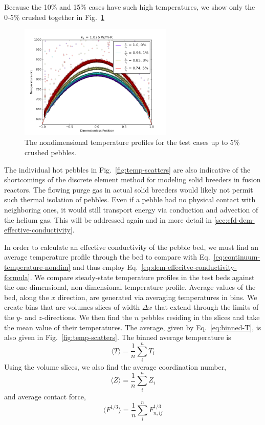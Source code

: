 Because the 10\% and 15\% cases have such high temperatures, we show only the 0-5\% crushed together in Fig.~\ref{fig:temp-scatters-zoomed}

\begin{figure}[htbp]
	\centering
	\includegraphics[width=0.65\textwidth]{chapters/figures/dem-evap-0-5-scatter-keff.png}
	\caption{The nondimensional temperature profiles for the test cases up to 5\% crushed pebbles.}
\label{fig:temp-scatters-zoomed}
\end{figure}

The individual hot pebbles in Fig.~\ref{fig:temp-scatters} are also indicative of the shortcomings of the discrete element method for modeling solid breeders in fusion reactors. The flowing purge gas in actual solid breeders would likely not permit such thermal isolation of pebbles. Even if a pebble had no physical contact with neighboring ones, it would still transport energy via conduction and advection of the helium gas. This will be addressed again and in more detail in \cref{sec:cfd-dem-effective-conductivity}.

In order to calculate an effective conductivity of the pebble bed, we must find an average temperature profile through the bed to compare with Eq.~\ref{eq:continuum-temperature-nondim} and thus employ Eq.~\ref{eq:dem-effecitve-conductivity-formula}. We compare steady-state temperature profiles in the test beds against the one-dimensional, non-dimensional temperature profile. Average values of the bed, along the $x$ direction, are generated via averaging temperatures in bins. We create bins that are volumes slices of width $\Delta x$ that extend through the limits of the $y$- and $z$-directions. We then find the $n$ pebbles residing in the slices and take the mean value of their temperatures. The average, given by Eq.~\ref{eq:binned-T}, is also given in Fig.~\ref{fig:temp-scatters}. The binned average temperature is 
\begin{equation}\label{eq:binned-T}
	\langle T\rangle = \frac{1}{n}\sum_{i}^n T_i 	
\end{equation}
Using the volume slices, we also find the average coordination number, 
\begin{equation}\label{eq:binned-z}
	\langle Z \rangle = \frac{1}{n}\sum_{i}^n Z_i
\end{equation}
and average contact force, 
\begin{equation}\label{eq:binned-f}
	\langle F^{1/3} \rangle = \frac{1}{n}\sum_{i}^n F_{n,ij}^{1/3}
\end{equation}


